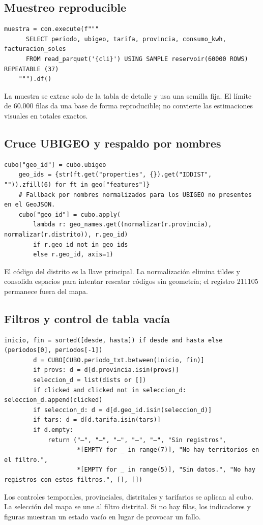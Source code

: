 \documentclass[11pt,a4paper]{article}
\begin{document}
\subsection{Muestreo reproducible}
\begin{lstlisting}[caption={dashboard/data\_loader.py — cargar\_datos, muestra}]
    muestra = con.execute(f"""
      SELECT periodo, ubigeo, tarifa, provincia, consumo_kwh, facturacion_soles
      FROM read_parquet('{cli}') USING SAMPLE reservoir(60000 ROWS) REPEATABLE (37)
    """).df()
\end{lstlisting}
La muestra se extrae solo de la tabla de detalle y usa una semilla fija. El límite de 60.000 filas da una base de forma reproducible; no convierte las estimaciones visuales en totales exactos.

\subsection{Cruce UBIGEO y respaldo por nombres}
\begin{lstlisting}[caption={dashboard/data\_loader.py — cargar\_datos, cruce espacial}]
    cubo["geo_id"] = cubo.ubigeo
    geo_ids = {str(ft.get("properties", {}).get("IDDIST", "")).zfill(6) for ft in geo["features"]}
    # Fallback por nombres normalizados para los UBIGEO no presentes en el GeoJSON.
    cubo["geo_id"] = cubo.apply(
        lambda r: geo_names.get((normalizar(r.provincia), normalizar(r.distrito)), r.geo_id)
        if r.geo_id not in geo_ids
        else r.geo_id, axis=1)
\end{lstlisting}
El código del distrito es la llave principal. La normalización elimina tildes y consolida espacios para intentar rescatar códigos sin geometría; el registro 211105 permanece fuera del mapa.

\subsection{Filtros y control de tabla vacía}
\begin{lstlisting}[caption={dashboard/app.py — actualizar, filtros y salida sin registros}]
        inicio, fin = sorted([desde, hasta]) if desde and hasta else (periodos[0], periodos[-1])
        d = CUBO[CUBO.periodo_txt.between(inicio, fin)]
        if provs: d = d[d.provincia.isin(provs)]
        seleccion_d = list(dists or [])
        if clicked and clicked not in seleccion_d: seleccion_d.append(clicked)
        if seleccion_d: d = d[d.geo_id.isin(seleccion_d)]
        if tars: d = d[d.tarifa.isin(tars)]
        if d.empty:
            return ("—", "—", "—", "—", "—", "Sin registros",
                    *[EMPTY for _ in range(7)], "No hay territorios en el filtro.",
                    *[EMPTY for _ in range(5)], "Sin datos.", "No hay registros con estos filtros.", [], [])
\end{lstlisting}
Los controles temporales, provinciales, distritales y tarifarios se aplican al cubo. La selección del mapa se une al filtro distrital. Si no hay filas, los indicadores y figuras muestran un estado vacío en lugar de provocar un fallo.
\end{document}
